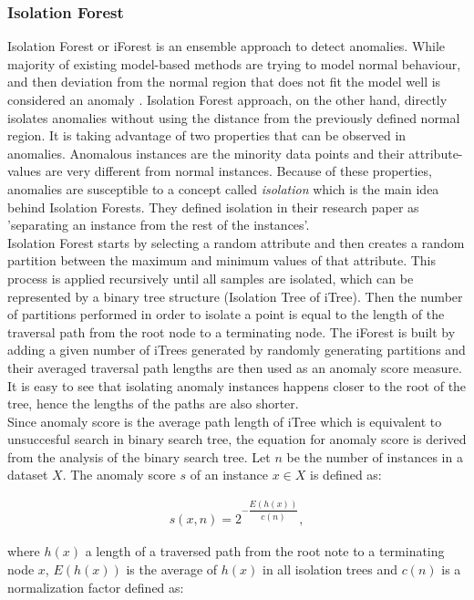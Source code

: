  \subsubsection{Isolation Forest}
 Isolation Forest or iForest \cite{liu2012isolation} is an ensemble approach to detect anomalies. While majority of existing model-based methods are trying to model normal behaviour, and then deviation from the normal region that does not fit the model well is considered an anomaly \cite{introToDataMining2005}. Isolation Forest approach, on the other hand, directly isolates anomalies without using the distance from the previously defined normal region. It is taking advantage of two properties that can be observed in anomalies. Anomalous instances are the minority data points and their attribute-values are very different from normal instances. Because of these properties, anomalies are susceptible to a concept called \textit{isolation} which is the main idea behind Isolation Forests. They defined isolation in their research paper as 'separating an instance from the rest of the instances'.\\
 Isolation Forest starts by selecting a random attribute and then creates a random partition between the maximum and minimum values of that attribute. This process is applied recursively until all samples are isolated, which can be represented by a binary tree structure (Isolation Tree of iTree). Then the number of partitions performed in order to isolate a point is equal to the length of the traversal path from the root node to a terminating node. The iForest is built by adding a given number of iTrees generated by randomly generating partitions and their averaged traversal path lengths are then used as an anomaly score measure. It is easy to see that isolating anomaly instances happens closer to the root of the tree, hence the lengths of the paths are also shorter. \\
 
 Since anomaly score is the average path length of iTree which is equivalent to unsuccesful search in binary search tree, the equation for anomaly score is derived from the analysis of the binary search tree.  Let $n$ be the number of instances in a dataset $X$. The anomaly score $s$ of an instance $x \in X$ is defined as: 
 
 \begin{gather}
     s(x, n) = 2^{- \dfrac{E(h(x))}{c(n)}},
 \end{gather}
 
 where $h(x)$ a length of a traversed path from the root note to a terminating node $x$, $E(h(x))$ is the average of $h(x)$ in all isolation trees and $c(n)$ is a normalization factor defined as: 
 
